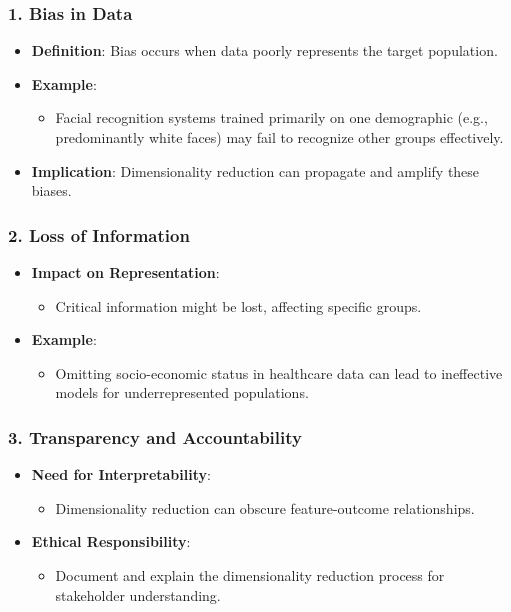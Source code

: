 \documentclass[aspectratio=169]{beamer}
\begin{document}
\begin{frame}[fragile]
    \frametitle{1. Bias in Data}
    \begin{itemize}
        \item \textbf{Definition}: Bias occurs when data poorly represents the target population.
        \item \textbf{Example}:
        \begin{itemize}
            \item Facial recognition systems trained primarily on one demographic (e.g., predominantly white faces) may fail to recognize other groups effectively.
        \end{itemize}
        \item \textbf{Implication}: Dimensionality reduction can propagate and amplify these biases.
    \end{itemize}
\end{frame}

\begin{frame}[fragile]
    \frametitle{2. Loss of Information}
    \begin{itemize}
        \item \textbf{Impact on Representation}:
            \begin{itemize}
                \item Critical information might be lost, affecting specific groups.
            \end{itemize}
        \item \textbf{Example}:
            \begin{itemize}
                \item Omitting socio-economic status in healthcare data can lead to ineffective models for underrepresented populations.
            \end{itemize}
    \end{itemize}
\end{frame}

\begin{frame}[fragile]
    \frametitle{3. Transparency and Accountability}
    \begin{itemize}
        \item \textbf{Need for Interpretability}:
            \begin{itemize}
                \item Dimensionality reduction can obscure feature-outcome relationships.
            \end{itemize}
        \item \textbf{Ethical Responsibility}:
            \begin{itemize}
                \item Document and explain the dimensionality reduction process for stakeholder understanding.
            \end{itemize}
    \end{itemize}
\end{frame}
\end{document}
